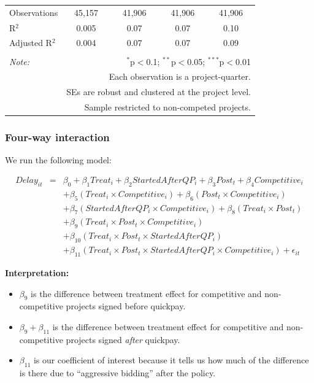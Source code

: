 \documentclass[
]{article}
\providecommand{\tightlist}{%
  \setlength{\itemsep}{0pt}\setlength{\parskip}{0pt}}
\begin{document}
\begin{table}[H]
\begin{tabular}{@{\extracolsep{-2pt}}lcccc}
Observations & 45,157 & 41,906 & 41,906 & 41,906 \\ 
R$^{2}$ & 0.005 & 0.07 & 0.07 & 0.10 \\ 
Adjusted R$^{2}$ & 0.004 & 0.07 & 0.07 & 0.09 \\ 
\hline 
\hline \\[-1.8ex] 
\textit{Note:}  & \multicolumn{4}{r}{$^{*}$p$<$0.1; $^{**}$p$<$0.05; $^{***}$p$<$0.01} \\ 
 & \multicolumn{4}{r}{Each observation is a project-quarter.} \\ 
 & \multicolumn{4}{r}{SEs are robust and clustered at the project level.} \\ 
 & \multicolumn{4}{r}{Sample restricted to non-competed projects.} \\ 
\end{tabular} 
\end{table}

\hypertarget{four-way-interaction}{%
\subsubsection{Four-way interaction}\label{four-way-interaction}}

We run the following model:

\[\begin{aligned} Delay_{it} &=& \beta_0 +\beta_1 Treat_i+ \beta_2 StartedAfterQP_i+ \beta_3 Post_t+ \beta_4 Competitive_i\\ && +  \beta_5 (Treat_i \times Competitive_i) + \beta_6 (Post_t \times Competitive_i)\\ && +  \beta_7 (StartedAfterQP_i \times Competitive_i) +\beta_8 (Treat_i \times Post_t)\\ && + \beta_9 (Treat_i \times Post_t \times Competitive_i) \\ && + \beta_{10} (Treat_i \times Post_t \times StartedAfterQP_i )\\ && + \beta_{11} (Treat_i \times Post_t \times StartedAfterQP_i \times Competitive_i) + \epsilon_{it} \end{aligned}\]

\textbf{Interpretation:}

\begin{itemize}
\tightlist
\item
  \(\beta_9\) is the difference between treatment effect for competitive
  and non-competitive projects signed before quickpay.
\item
  \(\beta_9 + \beta_{11}\) is the difference between treatment effect
  for competitive and non-competitive projects signed \emph{after}
  quickpay.
\item
  \(\beta_{11}\) is our coefficient of interest because it tells us how
  much of the difference is there due to ``aggressive bidding'' after
  the policy.
\end{itemize}
\end{document}
